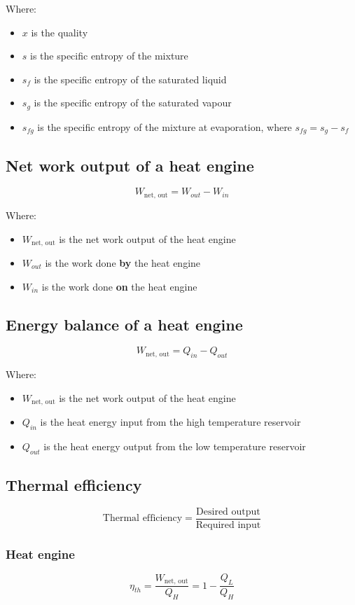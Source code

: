\documentclass[11pt]{article}
\begin{document}
Where:
\begin{itemize}
\item \(x\) is the quality
\item \(s\) is the specific entropy of the mixture
\item \(s_f\) is the specific entropy of the saturated liquid
\item \(s_g\) is the specific entropy of the saturated vapour
\item \(s_{fg}\) is the specific entropy of the mixture at evaporation, where \(s_{fg} = s_g - s_f\)
\end{itemize}
\subsection{Net work output of a heat engine}
\label{sec:org1ef4b33}
\[W_{\text{net, out}} = W_{out} - W_{in}\]

Where:
\begin{itemize}
\item \(W_{\text{net, out}}\) is the net work output of the heat engine
\item \(W_{out}\) is the work done \textbf{by} the heat engine
\item \(W_{in}\) is the work done \textbf{on} the heat engine
\end{itemize}
\subsection{Energy balance of a heat engine}
\label{sec:org093de40}
\[W_{\text{net, out}} = Q_{in} - Q_{out}\]

Where:
\begin{itemize}
\item \(W_{\text{net, out}}\) is the net work output of the heat engine
\item \(Q_{in}\) is the heat energy input from the high temperature reservoir
\item \(Q_{out}\) is the heat energy output from the low temperature reservoir
\end{itemize}
\subsection{Thermal efficiency}
\label{sec:org98aa36e}
\[\text{Thermal efficiency} = \frac{\text{Desired output}}{\text{Required input}}\]
\subsubsection{Heat engine}
\label{sec:org2c7b172}
\[\eta_{th} = \frac{W_{\text{net, out}}}{Q_{H}} = 1 - \frac{Q_L}{Q_H}\]
\end{document}
